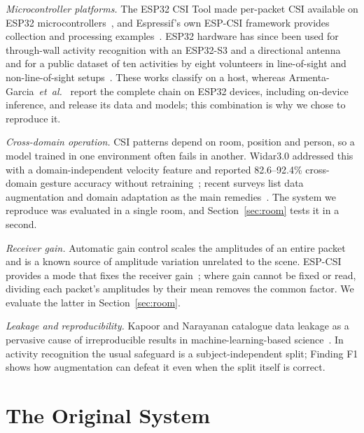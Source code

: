 \documentclass[journal]{IEEEtran}
\begin{document}
\emph{Microcontroller platforms.} The ESP32 CSI Tool made per-packet CSI available on
ESP32 microcontrollers~\cite{hernandez2020esp32}, and Espressif's own ESP-CSI
framework provides collection and processing examples~\cite{espressif_esp_csi}. ESP32
hardware has since been used for through-wall activity recognition with an ESP32-S3
and a directional antenna~\cite{strohmayer2023throughwall} and for a public dataset of
ten activities by eight volunteers in line-of-sight and non-line-of-sight
setups~\cite{lim2024esp32dataset}. These works classify on a host, whereas
Armenta-Garcia~\textit{et~al.}~\cite{armenta2025tools} report the complete chain on
ESP32 devices, including on-device inference, and release its data and models; this
combination is why we chose to reproduce it.

\emph{Cross-domain operation.} CSI patterns depend on room, position and person, so a
model trained in one environment often fails in another. Widar3.0 addressed this with
a domain-independent velocity feature and reported 82.6--92.4\% cross-domain gesture
accuracy without retraining~\cite{zheng2019widar3}; recent surveys list data
augmentation and domain adaptation as the main remedies~\cite{miao2025survey}. The
system we reproduce was evaluated in a single room, and Section~\ref{sec:room} tests
it in a second.

\emph{Receiver gain.} Automatic gain control scales the amplitudes of an entire packet
and is a known source of amplitude variation unrelated to the scene. ESP-CSI provides a
mode that fixes the receiver gain~\cite{espressif_esp_csi}; where gain cannot be fixed
or read, dividing each packet's amplitudes by their mean removes the common factor. We
evaluate the latter in Section~\ref{sec:room}.

\emph{Leakage and reproducibility.} Kapoor and Narayanan catalogue data leakage as a
pervasive cause of irreproducible results in machine-learning-based
science~\cite{kapoor2023leakage}. In activity recognition the usual safeguard is a
subject-independent split; Finding F1 shows how augmentation can defeat it even when
the split itself is correct.

\section{The Original System}
\label{sec:original}
\end{document}
